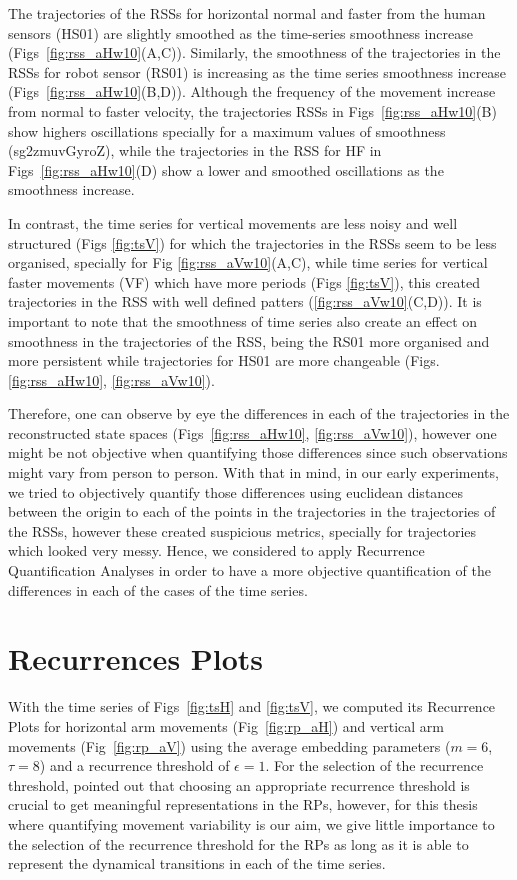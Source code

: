 The trajectories of the RSSs for horizontal normal and faster from the 
human sensors (HS01) are slightly smoothed as the time-series 
smoothness increase (Figs~\ref{fig:rss_aHw10}(A,C)). Similarly, 
the smoothness of the trajectories in the RSSs for robot sensor (RS01) 
is increasing as the time series smoothness increase 
(Figs~\ref{fig:rss_aHw10}(B,D)). 
Although the frequency of the movement increase from normal to faster velocity, 
the trajectories RSSs in Figs~\ref{fig:rss_aHw10}(B)
show highers oscillations specially for a maximum values of smoothness
(sg2zmuvGyroZ), while the trajectories in the RSS for HF in 
Figs~\ref{fig:rss_aHw10}(D) show a lower and smoothed oscillations 
as the smoothness increase.

In contrast, the time series for vertical movements are less noisy and 
well structured (Figs \ref{fig:tsV}) for which the trajectories in the RSSs 
seem to be less organised, specially for Fig \ref{fig:rss_aVw10}(A,C), 
while time series for vertical faster movements (VF) which have more 
periods (Figs \ref{fig:tsV}), this created trajectories in the RSS with 
well defined patters (\ref{fig:rss_aVw10}(C,D)).
It is important to note that the smoothness of time series also create 
an effect on smoothness in the trajectories of the RSS, being the RS01 
more organised and more persistent while trajectories for HS01 are 
more changeable (Figs. \ref{fig:rss_aHw10}, \ref{fig:rss_aVw10}).

Therefore, one can observe by eye the differences in each of the trajectories 
in the reconstructed state spaces 
(Figs~\ref{fig:rss_aHw10}, \ref{fig:rss_aVw10}), 
however one might be not objective when quantifying those differences 
since such observations might vary from person to person.
With that in mind, in our early experiments, we tried to objectively 
quantify those differences using euclidean distances between 
the origin to each of the points in the trajectories in the trajectories of 
the RSSs, however these created suspicious metrics, specially 
for trajectories which looked very messy.
Hence, we considered to apply Recurrence Quantification Analyses in order 
to have a more objective quantification of the differences in each of the 
cases of the time series.


\newpage
\section{Recurrences Plots}
With the time series of Figs~\ref{fig:tsH} and \ref{fig:tsV}, 
we computed its Recurrence Plots for horizontal arm movements 
(Fig~\ref{fig:rp_aH}) and vertical arm movements (Fig~\ref{fig:rp_aV}) 
using the average embedding parameters ($m=6$, $\tau=8$) and a recurrence 
threshold of $\epsilon=1$. For the selection of the recurrence threshold,
\cite{marwan2011} pointed out that choosing an appropriate 
recurrence threshold is crucial to get meaningful representations in the RPs, 
however, for this thesis where quantifying movement variability is our aim,
we give little importance to the selection of the recurrence threshold 
for the RPs as long as it is able to represent the dynamical transitions 
in each of the time series.


